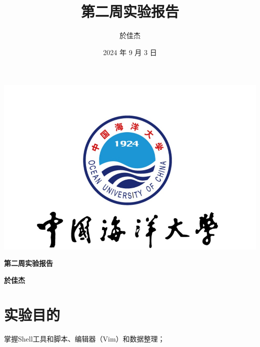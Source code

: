 \documentclass[UTF8]{ctexart}
\begin{document}
\begin{center}
    \includegraphics[width=\textwidth]{o} %
\end{center}

\begin{center}
    \huge\textbf{第二周实验报告}
\end{center}

\begin{center}
    \huge\textbf{於佳杰}
\end{center}
\newpage

\title{第二周实验报告}
\author{於佳杰}
\date{2024 年 9 月 3 日}
\maketitle

\tableofcontents
\newpage
{}

\pagestyle{fancy}
\fancyhf{}
\renewcommand{\headrulewidth}{1pt}
\renewcommand{\footrulewidth}{1pt}
\fancyhead[C]{\rightmark}
\fancyfoot[C]{\thepage}
\fancyhead[R]{\thepage}



\section{实验目的}
{\color{red}掌握Shell工具和脚本、编辑器（Vim）和数据整理；}
\end{document}
